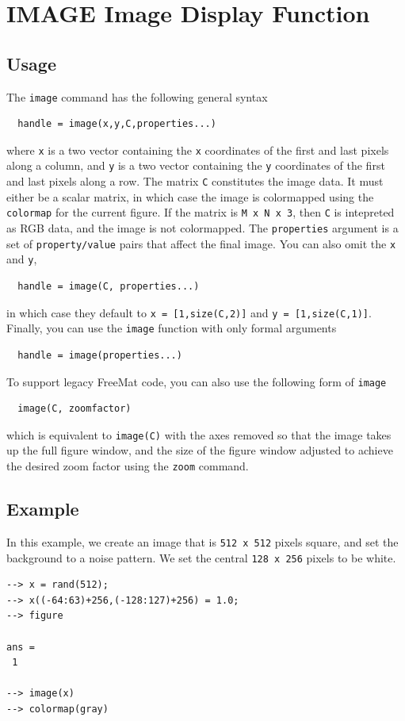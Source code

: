 \section{IMAGE Image Display Function}

\subsection{Usage}

The \verb|image| command has the following general syntax
\begin{verbatim}
  handle = image(x,y,C,properties...)
\end{verbatim}
where \verb|x| is a two vector containing the \verb|x| coordinates
of the first and last pixels along a column, and \verb|y| is a
two vector containing the \verb|y| coordinates of the first and
last pixels along a row.  The matrix \verb|C| constitutes the
image data.  It must either be a scalar matrix, in which case
the image is colormapped using the  \verb|colormap| for the current
figure.  If the matrix is \verb|M x N x 3|, then \verb|C| is intepreted
as RGB data, and the image is not colormapped.  The \verb|properties|
argument is a set of \verb|property/value| pairs that affect the
final image.  You can also omit the \verb|x| and \verb|y|, 
\begin{verbatim}
  handle = image(C, properties...)
\end{verbatim}
in which case they default to \verb|x = [1,size(C,2)]| and 
\verb|y = [1,size(C,1)]|.  Finally, you can use the \verb|image| function
with only formal arguments
\begin{verbatim}
  handle = image(properties...)
\end{verbatim}

To support legacy FreeMat code, you can also use the following
form of \verb|image|
\begin{verbatim}
  image(C, zoomfactor)
\end{verbatim}
which is equivalent to \verb|image(C)| with the axes removed so that
the image takes up the full figure window, and the size of the
figure window adjusted to achieve the desired zoom factor using the
\verb|zoom| command.
\subsection{Example}

In this example, we create an image that is \verb|512 x 512| pixels
square, and set the background to a noise pattern.  We set the central
\verb|128 x 256| pixels to be white.
\begin{verbatim}
--> x = rand(512);
--> x((-64:63)+256,(-128:127)+256) = 1.0;
--> figure

ans = 
 1 

--> image(x)
--> colormap(gray)
\end{verbatim}


